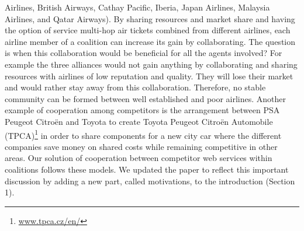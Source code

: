 \documentclass[times, 12pt,a4paper]{article}
\begin{document}
{Airlines, British Airways, Cathay Pacific, Iberia, Japan Airlines,
Malaysia Airlines, and Qatar Airways). By sharing resources and
market share and having the option of service multi-hop air
tickets combined from different airlines, each airline member of a
coalition can increase its gain by collaborating. The question is
when this collaboration would be beneficial for all the agents
involved? For example the three alliances would not gain anything
by collaborating and sharing resources with airlines of low
reputation and quality. They will lose their market and would
rather stay away from this collaboration. Therefore, no stable
community can be formed between well established and poor
airlines. Another example of cooperation among competitors is the
arrangement between PSA Peugeot Citro\"{e}n and Toyota to create
Toyota Peugeot Citro\"{e}n Automobile
(TPCA)\footnote{\url{www.tpca.cz/en/}} in order to share
components for a new city car where the different companies save
money on shared costs while remaining competitive in other areas.
Our solution of cooperation between competitor web services within
coalitions follows these models. We updated the paper to reflect
this important discussion by adding a new part, called
motivations, to the introduction (Section 1).}
\end{document}
